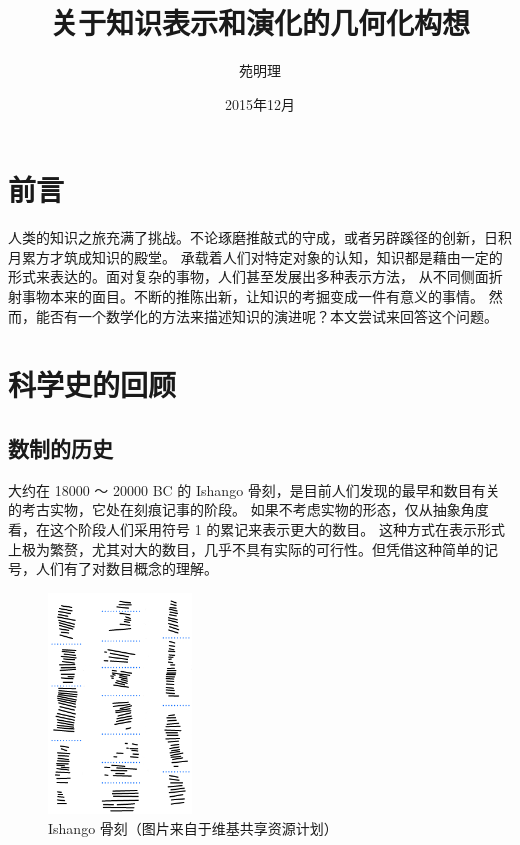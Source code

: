 \documentclass[a4paper,12pt]{article}
\title{关于知识表示和演化的几何化构想}
\author{苑明理}
\date{2015年12月}
\begin{document}
\maketitle{}

\renewcommand\contentsname{目录}
\setcounter{tocdepth}{2}
\tableofcontents

\newpage

\section{前言}

人类的知识之旅充满了挑战。不论琢磨推敲式的守成，或者另辟蹊径的创新，日积月累方才筑成知识的殿堂。
承载着人们对特定对象的认知，知识都是藉由一定的形式来表达的。面对复杂的事物，人们甚至发展出多种表示方法，
从不同侧面折射事物本来的面目。不断的推陈出新，让知识的考掘变成一件有意义的事情。
然而，能否有一个数学化的方法来描述知识的演进呢？本文尝试来回答这个问题。

\section{科学史的回顾}

\subsection{数制的历史}

大约在 18000 ～ 20000 BC 的 Ishango 骨刻，是目前人们发现的最早和数目有关的考古实物，它处在刻痕记事的阶段。
如果不考虑实物的形态，仅从抽象角度看，在这个阶段人们采用符号 1 的累记来表示更大的数目。
这种方式在表示形式上极为繁赘，尤其对大的数目，几乎不具有实际的可行性。但凭借这种简单的记号，人们有了对数目概念的理解。

\begin{figure}[ht]
\centering
\includegraphics[width=1.5in]{images/IshangoAllColumns.png}
\caption{Ishango 骨刻（图片来自于维基共享资源计划）}
\end{figure}
\end{document}
